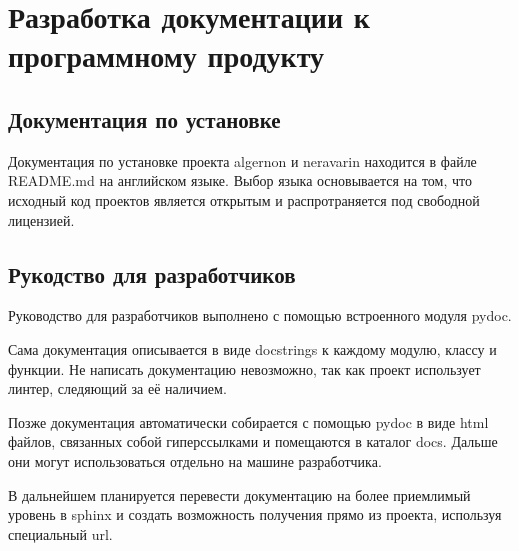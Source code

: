\section{Разработка документации к программному продукту}

\tocless\subsection{Документация по установке}

Документация по установке проекта algernon и neravarin находится в файле README.md на английском языке.
Выбор языка основывается на том, что исходный код проектов является открытым и распротраняется под свободной лицензией.

\tocless\subsection{Рукодство для разработчиков}

Руководство для разработчиков выполнено с помощью встроенного модуля pydoc.

Сама документация описывается в виде docstrings к каждому модулю, классу и функции. Не написать документацию невозможно, так как
проект использует линтер, следяющий за её наличием.

Позже документация автоматически собирается с помощью pydoc в виде html файлов, связанных собой гиперссылками и помещаются в каталог
docs. Дальше они могут использоваться отдельно на машине разработчика.

В дальнейшем планируется перевести документацию на более приемлимый уровень в sphinx и создать возможность получения прямо из проекта,
используя специальный url.
